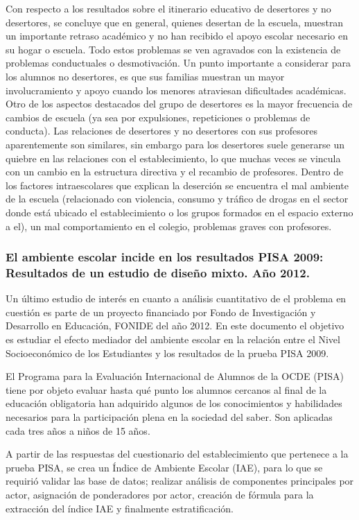Con respecto a los resultados sobre el itinerario educativo de desertores y no desertores, se concluye que en general, quienes desertan de la escuela, muestran un importante retraso académico y no han recibido el apoyo escolar necesario en su hogar o escuela. Todo estos problemas se ven agravados con la existencia de problemas conductuales o desmotivación. Un punto importante a considerar para los alumnos no desertores, es que sus familias muestran un mayor involucramiento y apoyo cuando los menores atraviesan dificultades académicas. Otro de los aspectos destacados del grupo de desertores es la mayor frecuencia de cambios de escuela (ya sea por expulsiones, repeticiones o problemas de conducta). Las relaciones de desertores y no desertores con sus profesores aparentemente son similares, sin embargo para los desertores suele generarse un quiebre en las relaciones con el establecimiento, lo que muchas veces se vincula con un cambio en la estructura directiva y el recambio de profesores. 
Dentro de los factores intraescolares que explican la deserción se encuentra el mal ambiente de la escuela (relacionado con violencia, consumo y tráfico de drogas en el sector donde está ubicado el establecimiento o los grupos formados en el espacio externo a el), un mal comportamiento en el colegio,  problemas graves con profesores. 

\subsubsection{El ambiente escolar incide en los resultados PISA 2009: Resultados de un estudio de diseño mixto. Año 2012.}
Un último estudio de interés en cuanto a análisis cuantitativo de el problema en cuestión es parte de un proyecto financiado por Fondo de Investigación y Desarrollo en Educación, FONIDE del año 2012. En este documento el objetivo es estudiar el efecto mediador del ambiente escolar en la relación entre el Nivel Socioeconómico de los Estudiantes y los resultados de la prueba PISA 2009. 

El Programa para la Evaluación Internacional de Alumnos de la OCDE (PISA) tiene por objeto evaluar hasta qué punto los alumnos cercanos al final de la educación obligatoria han adquirido algunos de los conocimientos y habilidades necesarios para la participación plena en la sociedad del saber. Son aplicadas cada tres años a niños de 15 años.

A partir de las respuestas del cuestionario del establecimiento que pertenece a la prueba PISA, se crea un Índice de Ambiente Escolar (IAE), para lo que se requirió validar las base de datos; realizar análisis de componentes principales por actor, asignación de ponderadores por actor, creación de fórmula para la extracción del índice IAE y finalmente estratificación. 


